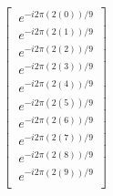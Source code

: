 \documentclass[preview]{standalone}
\begin{document}
\begin{align*}
\left[\begin{array}{l}\
            e^{-i 2 \pi(2(0)) / 9  }\\\
            e^{-i 2 \pi(2(1)) / 9  }\\\
            e^{-i 2 \pi(2(2)) / 9  }\\\
            e^{-i 2 \pi(2(3)) / 9  }\\\
            e^{-i 2 \pi(2(4)) / 9  }\\\
            e^{-i 2 \pi(2(5)) / 9  }\\\
            e^{-i 2 \pi(2(6)) / 9  }\\\
            e^{-i 2 \pi(2(7)) / 9  }\\\
            e^{-i 2 \pi(2(8)) / 9  }\\\
            e^{-i 2 \pi(2(9)) / 9  }\\\
            \end{array}\right]
\end{align*}
\end{document}
